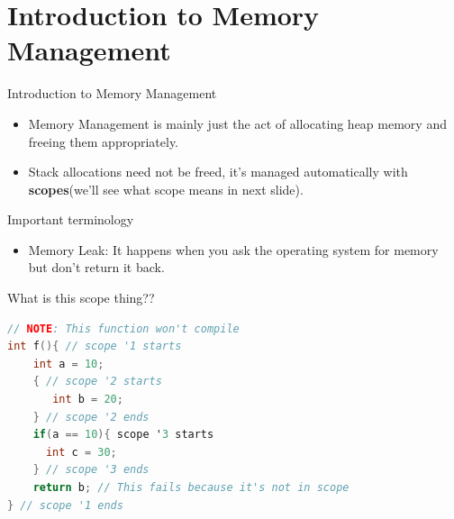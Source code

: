 \documentclass[
  10pt,
  ignorenonframetext,
]{beamer}
\providecommand{\tightlist}{%
  \setlength{\itemsep}{0pt}\setlength{\parskip}{0pt}}
\begin{document}
\hypertarget{introduction-to-memory-management}{%
\section{Introduction to Memory
Management}\label{introduction-to-memory-management}}

\begin{frame}{Introduction to Memory Management}
\begin{itemize}
\tightlist
\item
  Memory Management is mainly just the act of
  allocating heap memory and freeing them
  appropriately.
\end{itemize}

\pause

\begin{itemize}
\tightlist
\item
  Stack allocations need not be freed, it's
  managed automatically with \textbf{scopes}(we'll
  see what scope means in next slide).
\end{itemize}

\pause

\begin{block}{Important terminology}
\protect\hypertarget{important-terminology}{}
\begin{itemize}
\tightlist
\item
  Memory Leak: It happens when you ask the
  operating system for memory but don't return it
  back.
\end{itemize}
\end{block}
\end{frame}

\begin{frame}[fragile]{What is this scope thing??}
\protect\hypertarget{what-is-this-scope-thing}{}
\begin{lstlisting}[language=C]
// NOTE: This function won't compile
int f(){ // scope '1 starts
    int a = 10;
    { // scope '2 starts
       int b = 20;
    } // scope '2 ends
    if(a == 10){ scope '3 starts
      int c = 30;
    } // scope '3 ends
    return b; // This fails because it's not in scope
} // scope '1 ends
\end{lstlisting}
\end{frame}
\end{document}
